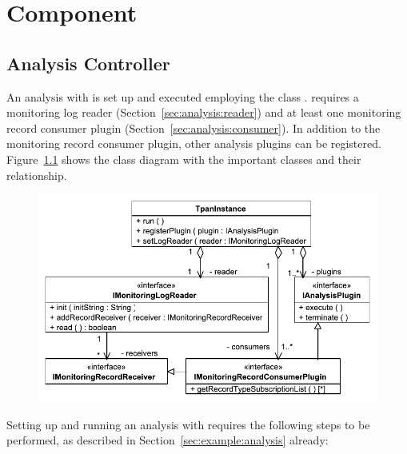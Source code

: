 % 


\chapter{\KiekerAnalysisPart{} Component}\label{chap:componentsAnalysis}


\section{Analysis Controller}\label{sec:analysis:controller}

An analysis with \KiekerAnalysisPart{} is set up and executed employing %
the class . %
\KiekerAnalysisPart{} requires a monitoring log reader %
(Section~\ref{sec:analysis:reader}) and at least %
one monitoring record consumer plugin (Section~\ref{sec:analysis:consumer}). %
In addition to the monitoring record consumer plugin, %
other analysis plugins can be registered. %
Figure~\ref{fig:analysisController:classdiagram} shows the class diagram %
with the important \KiekerAnalysisPart{} classes and their relationship. %

\begin{figure}[h]\centering
\includegraphics[scale=0.7]{images/kieker_TpanInstance}
\caption{}
\label{fig:analysisController:classdiagram}
\end{figure}

\noindent Setting up and running an analysis with \KiekerAnalysisPart{} requires the %
following steps to be performed, as described in Section~\ref{sec:example:analysis} already:\\

